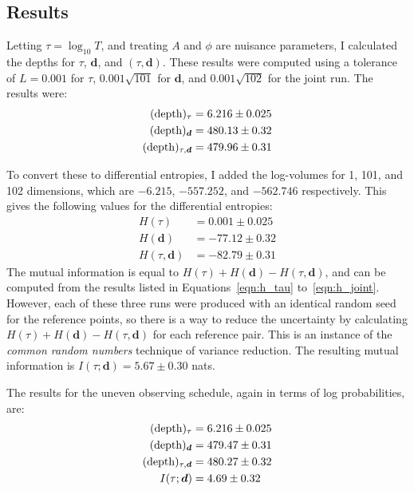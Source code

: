 \documentclass[entropy,article,accept,oneauthor,pdftex,10pt,a4paper]{mdpi}
\renewcommand{\d}{\boldsymbol{d}}
\newcommand{\depth}{(\textnormal{depth})}
\begin{document}
\subsection{Results}

Letting $\tau = \log_{10} T$, and treating
$A$ and $\phi$ are nuisance parameters, I calculated the depths
for $\tau$, $\d$, and $(\tau, \d)$.
These results were computed using a tolerance of $L=0.001$
for $\tau$, $0.001\sqrt{101}$ for $\d$, and $0.001\sqrt{102}$ for
the joint run. The results were:
\begin{align}
\depth_{\tau}    &= 6.216  \pm 0.025 \\
\depth_{\d}      &= 480.13 \pm 0.32   \\
\depth_{\tau,\d} &= 479.96 \pm 0.31
\end{align}

To convert these to differential entropies, I added the log-volumes
for 1, 101, and 102 dimensions, which are
$-6.215$, $-557.252$, and $-562.746$ respectively. This gives
the following values for the differential entropies:
\begin{align}
H(\tau)     &=  0.001 \pm 0.025 \label{eqn:h_tau}\\
H(\d)       &= -77.12 \pm 0.32   \\
H(\tau, \d) &= -82.79 \pm 0.31   \label{eqn:h_joint}
\end{align}
The mutual information is equal to $H(\tau) + H(\d) - H(\tau, \d)$,
and can be computed from the results listed
in Equations~\ref{eqn:h_tau} to~\ref{eqn:h_joint}.
However, each of these three runs were produced with an identical random
seed for the reference points, so there is a way to reduce the uncertainty
by calculating $H(\tau) + H(\d) - H(\tau, \d)$ for each reference pair.
This is an instance of the
{\em common random numbers} technique of variance reduction.
The resulting  mutual information is
$I(\tau; \d) = 5.67 \pm 0.30$ nats.

The results for the uneven observing schedule, again in terms of log
probabilities, are:
\begin{align}
\depth_{\tau}      &= 6.216  \pm 0.025 \\
\depth_{\d}        &= 479.47 \pm 0.31  \\
\depth_{\tau, \d}  &= 480.27 \pm 0.32  \\
I(\tau; \d)        &= 4.69 \pm 0.32
\end{align}
\end{document}
